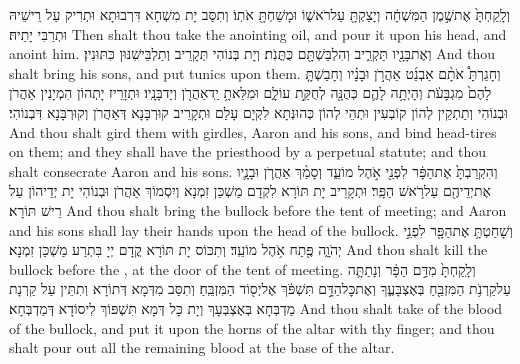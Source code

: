 {וְלָֽקַחְתָּ֙ אֶת\maqqaf שֶׁ֣מֶן הַמִּשְׁחָ֔ה וְיָצַקְתָּ֖ עַל\maqqaf רֹאשׁ֑וֹ וּמָשַׁחְתָּ֖ אֹתֽוֹ׃}
{וְתִסַּב יָת מִשְׁחָא דִּרְבוּתָא וּתְרִיק עַל רֵישֵׁיהּ וּתְרַבִּי יָתֵיהּ׃}
{Then shalt thou take the anointing oil, and pour it upon his head, and anoint him.}{}
{וְאֶת\maqqaf בָּנָ֖יו תַּקְרִ֑יב וְהִלְבַּשְׁתָּ֖ם כֻּתֳּנֹֽת׃}
{וְיָת בְּנוֹהִי תְּקָרֵיב וְתַלְבֵּישִׁנּוּן כִּתּוּנִין׃}
{And thou shalt bring his sons, and put tunics upon them.}{}
{וְחָגַרְתָּ֩ אֹתָ֨ם אַבְנֵ֜ט אַהֲרֹ֣ן וּבָנָ֗יו וְחָבַשְׁתָּ֤ לָהֶם֙ מִגְבָּעֹ֔ת וְהָיְתָ֥ה לָהֶ֛ם כְּהֻנָּ֖ה לְחֻקַּ֣ת עוֹלָ֑ם וּמִלֵּאתָ֥ יַֽד\maqqaf אַהֲרֹ֖ן וְיַד\maqqaf בָּנָֽיו׃}
{וּתְזָרֵיז יָתְהוֹן הִמְיָנִין אַהֲרֹן וּבְנוֹהִי וְתַתְקֵין לְהוֹן קוֹבְעִין וּתְהֵי לְהוֹן כְּהוּנְּתָא לִקְיָם עָלַם וּתְקָרֵיב קוּרְבָּנָא דְּאַהֲרֹן וְקוּרְבָּנָא דִּבְנוֹהִי׃}
{And thou shalt gird them with girdles, Aaron and his sons, and bind head-tires on them; and they shall have the priesthood by a perpetual statute; and thou shalt consecrate Aaron and his sons.}{}
{וְהִקְרַבְתָּ֙ אֶת\maqqaf הַפָּ֔ר לִפְנֵ֖י אֹ֣הֶל מוֹעֵ֑ד וְסָמַ֨ךְ אַהֲרֹ֧ן וּבָנָ֛יו אֶת\maqqaf יְדֵיהֶ֖ם עַל\maqqaf רֹ֥אשׁ הַפָּֽר׃}
{וּתְקָרֵיב יָת תּוֹרָא לִקְדָם מַשְׁכַּן זִמְנָא וְיִסְמוֹךְ אַהֲרֹן וּבְנוֹהִי יָת יְדֵיהוֹן עַל רֵישׁ תּוֹרָא׃}
{And thou shalt bring the bullock before the tent of meeting; and Aaron and his sons shall lay their hands upon the head of the bullock.}{}
{וְשָׁחַטְתָּ֥ אֶת\maqqaf הַפָּ֖ר לִפְנֵ֣י יְהֹוָ֑ה פֶּ֖תַח אֹ֥הֶל מוֹעֵֽד׃}
{וְתִכּוֹס יָת תּוֹרָא קֳדָם יְיָ בִּתְרַע מַשְׁכַּן זִמְנָא׃}
{And thou shalt kill the bullock before the \lord, at the door of the tent of meeting.}{}
{וְלָֽקַחְתָּ֙ מִדַּ֣ם הַפָּ֔ר וְנָתַתָּ֛ה עַל\maqqaf קַרְנֹ֥ת הַמִּזְבֵּ֖חַ בְּאֶצְבָּעֶ֑ךָ וְאֶת\maqqaf כׇּל\maqqaf הַדָּ֣ם תִּשְׁפֹּ֔ךְ אֶל\maqqaf יְס֖וֹד הַמִּזְבֵּֽחַ׃}
{וְתִסַּב מִדְּמָא דְּתוֹרָא וְתִתֵּין עַל קַרְנָת מַדְבְּחָא בְּאֶצְבְּעָךְ וְיָת כָּל דְּמָא תִּשְׁפּוֹךְ לִיסוֹדָא דְּמַדְבְּחָא׃}
{And thou shalt take of the blood of the bullock, and put it upon the horns of the altar with thy finger; and thou shalt pour out all the remaining blood at the base of the altar.}{}
